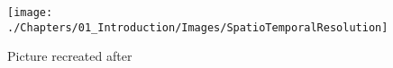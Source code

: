 \begin{figure}[ht]
	\centering
	\texttt{[image: ./Chapters/01\_Introduction/Images/SpatioTemporalResolution]}
	\caption{Picture recreated after \cite{Sejnowski2014}}
	\label{fig:spatiotemporal}
\end{figure}